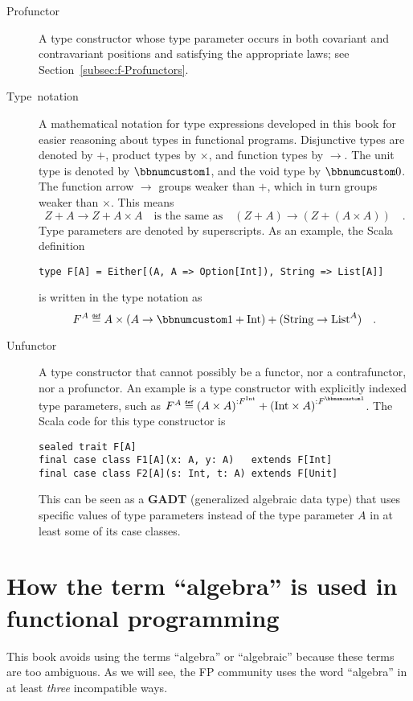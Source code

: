 \begin{description}
\item [{Profunctor}] A type constructor whose type parameter
occurs in both covariant and contravariant positions and satisfying
the appropriate laws; see Section~\ref{subsec:f-Profunctors}.
\item [{Type~notation}] A mathematical notation
for type expressions developed in this book for easier reasoning about
types in functional programs. Disjunctive types are denoted by $+$,
product types by $\times$, and function types by $\rightarrow$.
The unit type is denoted by $\bbnum 1$, and the void type by $\bbnum 0$.
The function arrow $\rightarrow$ groups weaker than $+$, which in
turn groups weaker than $\times$. This means
\[
Z+A\rightarrow Z+A\times A\quad\text{is the same as}\quad\left(Z+A\right)\rightarrow\left(Z+\left(A\times A\right)\right)\quad.
\]
 Type parameters are denoted by superscripts. As an example, the Scala
definition\texttt{}
\begin{lstlisting}
type F[A] = Either[(A, A => Option[Int]), String => List[A]]
\end{lstlisting}
is written in the type notation as 
\[
F^{A}\triangleq A\times\left(A\rightarrow\bbnum 1+\text{Int}\right)+(\text{String}\rightarrow\text{List}^{A})\quad.
\]
\item [{Unfunctor}] A type constructor that cannot possibly
be a functor, nor a contrafunctor, nor a profunctor. An example is
a type constructor with explicitly indexed type parameters, such as
$F^{A}\triangleq\left(A\times A\right)^{:F^{\text{Int}}}+\left(\text{Int}\times A\right)^{:F^{\bbnum 1}}$.
The Scala code for this type constructor is
\begin{lstlisting}
sealed trait F[A]
final case class F1[A](x: A, y: A)   extends F[Int]
final case class F2[A](s: Int, t: A) extends F[Unit]
\end{lstlisting}
This can be seen as a \textbf{GADT}
(generalized algebraic data type) that uses specific values of type
parameters instead of the type parameter $A$ in at least some of
its case classes.
\end{description}

\section{How the term \textquotedblleft algebra\textquotedblright{} is used
in functional programming}

This book avoids using the terms \textsf{``}algebra\textsf{''} or
\textsf{``}algebraic\textsf{''} because these terms are too ambiguous.
As we will see, the FP community uses the word \textsf{``}algebra\textsf{''} in at
least \emph{three} incompatible ways.

